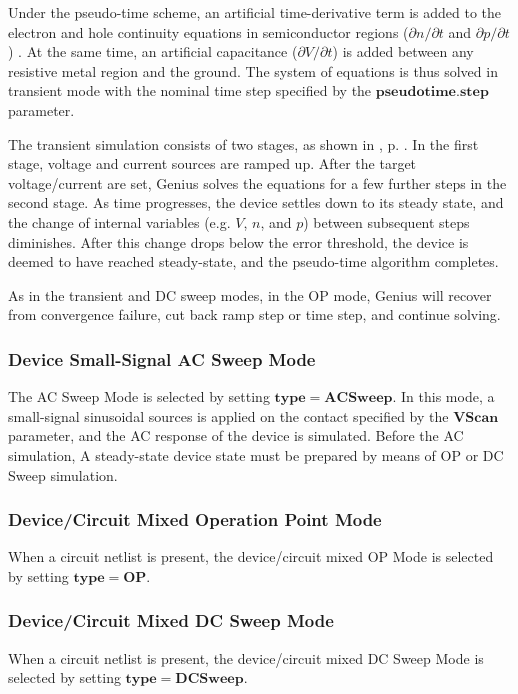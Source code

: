 \documentclass[oneside,12pt]{cgd_book}
\begin{document}
Under the pseudo-time scheme, an artificial time-derivative term is added to the electron and hole
          continuity equations in semiconductor regions ($\partial n/\partial t$
and $\partial p/\partial t$) . At the same time, an artificial capacitance ($\partial V/\partial t$) is added between any resistive metal region and the ground. The
          system of equations is thus solved in transient mode with the nominal time step specified by the
$\mathbf{pseudotime.step}$ parameter.
\par
The transient simulation consists of two stages, as shown in ,
p. \pageref{fig:CmdRef:SolveOP:flowchart}. In the first stage, voltage and current sources are ramped up.
          After the target voltage/current are set, Genius solves the equations for a few further steps in the second
          stage. As time progresses, the device settles down to its steady state, and the change of internal variables
          (e.g. $V$, $n$, and $p$)
          between subsequent steps diminishes. After this change drops below the error threshold, the device is deemed
          to have reached steady-state, and the pseudo-time algorithm completes.
\par
As in the transient and DC sweep modes, in the OP mode, Genius will recover from convergence failure,
          cut back ramp step or time step, and continue solving.
\par
\subsubsection{Device Small-Signal AC Sweep Mode}
The AC Sweep Mode is selected by setting $\mathbf{type=ACSweep}$. In this mode, a
          small-signal sinusoidal sources is applied on the contact specified by the
$\mathbf{VScan}$ parameter, and the AC response of the device is simulated. Before the AC simulation, A steady-state device
          state must be prepared by means of OP or DC Sweep simulation.
\par
\subsubsection{Device/Circuit Mixed Operation Point Mode}
When a circuit netlist is present, the device/circuit mixed OP Mode is selected by setting
$\mathbf{type=OP}$.
\par
\subsubsection{Device/Circuit Mixed DC Sweep Mode}
When a circuit netlist is present, the device/circuit mixed DC Sweep Mode is selected by setting
$\mathbf{type=DCSweep}$.
\par
\end{document}
